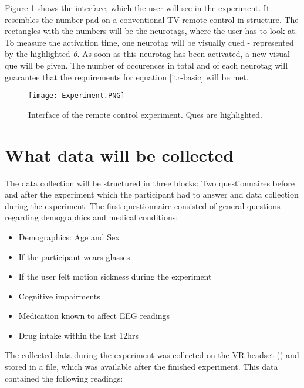             Figure \ref*{gui-remote} shows the interface, which the user will see in the experiment. It resembles the number pad on a conventional TV remote control in structure. The rectangles with the numbers will be the neurotags, where the user has to look at. To measure the activation time, one neurotag will be visually cued - represented by the highlighted \textit{6}. As soon as this neurotag has been activated, a new visual que will be given. The number of occurences in total and of each neurotag will guarantee that the requirements for equation \ref*{itr-basic} will be met.

            \begin{figure}[h]     %
                \centering
                \texttt{[image: Experiment.PNG]} 
                \caption{Interface of the remote control experiment. Ques are highlighted.}\label{gui-remote}
            \end{figure}                    

        \section{What data will be collected}\label{datacollection}

            The data collection will be structured in three blocks: Two questionnaires before and after the experiment which the participant had to answer and data collection during the experiment. The first questionnaire consisted of general questions regarding demographics and medical conditions:

            \begin{itemize}
                \item Demographics: Age and Sex
                \item If the participant wears glasses
                \item If the user felt motion sickness during the experiment
                \item Cognitive impairments
                \item Medication known to affect EEG readings
                \item Drug intake within the last 12hrs
            \end{itemize}

            The collected data during the experiment was collected on the VR headset () and stored in a file, which was available after the finished experiment. This data contained the following readings:

